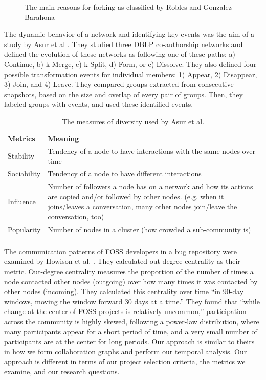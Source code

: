 \documentclass[conference]{IEEEtran}
\begin{document}
\begin{figure} [!htbp]
\centering
\caption{The main reasons for forking as classified by Robles and Gonzalez-Barahona \cite{Robles}}
\label{figureReasonsForForkingPieChart}
\end{figure}

The dynamic behavior of a network and identifying key events was the aim of a study by Asur et al \cite{Asur}. They studied three DBLP co-authorship networks and defined the evolution of these networks as following one of these paths: a) Continue, b) k-Merge, c) k-Split, d) Form, or e) Dissolve. They also defined four possible transformation events for individual members: 1) Appear, 2) Disappear, 3) Join, and 4) Leave. They compared groups extracted from consecutive snapshots, based on the size and overlap of every pair of groups. Then, they labeled groups with events, and used these identified events.\\

\begin{table}[!htbp]
\caption{The measures of diversity used by Asur et al. \cite{Asur}}
\label{tableDiversityMeasuresAsurEtAl} 
\begin{tabular}{p{} p{}}
\hline\noalign{\smallskip}
\textbf{Metrics} & \textbf{Meaning} \\
\noalign{\smallskip}\hline\noalign{\smallskip}
Stability & Tendency of a node to have interactions with the same nodes over time \\ \hline
Sociability & Tendency of a node to have different interactions \\\hline
Influence & Number of followers a node has on a network and how its actions are copied and/or followed by other nodes. (e.g. when it joins/leaves a conversation, many other nodes join/leave the conversation, too) \\\hline
Popularity & Number of nodes in a cluster (how crowded a sub-community is) \\
\noalign{\smallskip}\hline
\end{tabular}
\end{table}

The communication patterns of FOSS developers in a bug repository were examined by Howison et al. \cite{HowisonSocialDynamics}. They calculated out-degree centrality as their metric. Out-degree centrality measures the proportion of the number of times a node contacted other nodes (outgoing) over how many times it was contacted by other nodes (incoming). They calculated this centrality over time ``in 90-day windows, moving the window forward 30 days at a time.'' They found that ``while change at the center of FOSS projects is relatively uncommon,'' participation across the community is highly skewed, following a power-law distribution, where many participants appear for a short period of time, and a very small number of participants are at the center for long periods. Our approach is similar to theirs in how we form collaboration graphs and perform our temporal analysis. Our approach is different in terms of our project selection criteria, the metrics we examine, and our research questions.\\
\end{document}

